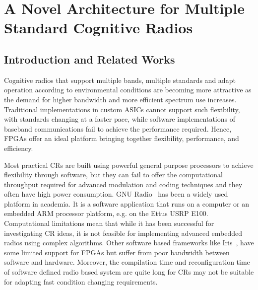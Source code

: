 \chapter{A Novel Architecture for Multiple Standard Cognitive Radios}
\label{chap:MSCR}

\section{Introduction and Related Works}
Cognitive radios that support multiple bands, multiple standards and adapt operation according to environmental conditions are becoming more attractive as the demand for higher bandwidth
and more efficient spectrum use increases. 
Traditional implementations in custom ASICs cannot support such flexibility, with standards changing at a faster pace, while software implementations of baseband communications fail to achieve the performance required.
Hence, FPGAs offer an ideal platform bringing together flexibility, performance, and efficiency.

Most practical CRs are built using powerful general purpose processors to achieve flexibility through software, but they can fail to offer the computational throughput required for advanced modulation and coding techniques and they often have high power consumption.
GNU Radio~\cite{gnuradio} has been a widely used platform in academia. 
It is a software application that runs on a computer or an embedded ARM processor platform, e.g. on the Ettus USRP E100. 
Computational limitations mean that while it has been successful for investigating CR ideas, it is not feasible for implementing advanced embedded radios using complex algorithms.
Other software based frameworks like Iris~\cite{Sutton2010}, have some limited support for FPGAs but suffer from poor bandwidth between software and hardware.
Moreover, the compilation time and reconfiguration time of software defined radio based system are quite long for CRs may not be suitable for adapting fast condition changing requirements.

